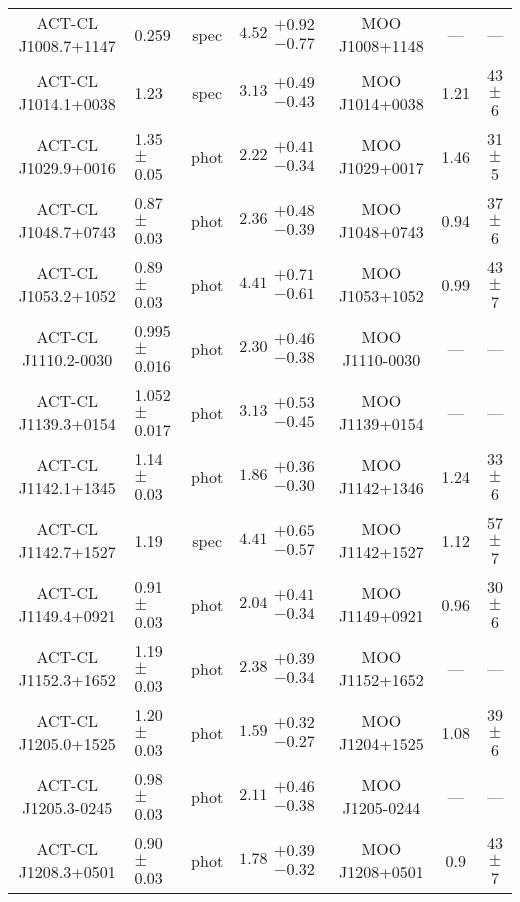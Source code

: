 \begin{longtable}[p!]{clccccc}
ACT-CL J1008.7+1147 & 0.259& spec & $4.52\substack{+0.92\\-0.77}$ & MOO J1008+1148 & --- & ---\\
ACT-CL J1014.1+0038 & 1.23& spec & $3.13\substack{+0.49\\-0.43}$ & MOO J1014+0038 & 1.21 & 43$\pm$ 6 \\
ACT-CL J1029.9+0016 & 1.35$\pm$ 0.05 & phot & $2.22\substack{+0.41\\-0.34}$ & MOO J1029+0017 & 1.46 & 31$\pm$ 5 \\
ACT-CL J1048.7+0743 & 0.87$\pm$ 0.03 & phot & $2.36\substack{+0.48\\-0.39}$ & MOO J1048+0743 & 0.94 & 37$\pm$ 6 \\
ACT-CL J1053.2+1052 & 0.89$\pm$ 0.03 & phot & $4.41\substack{+0.71\\-0.61}$ & MOO J1053+1052 & 0.99 & 43$\pm$ 7 \\
ACT-CL J1110.2-0030 & 0.995$\pm$ 0.016 & phot & $2.30\substack{+0.46\\-0.38}$ & MOO J1110-0030 & --- & ---\\
ACT-CL J1139.3+0154 & 1.052$\pm$ 0.017 & phot & $3.13\substack{+0.53\\-0.45}$ & MOO J1139+0154 & --- & ---\\
ACT-CL J1142.1+1345 & 1.14$\pm$ 0.03 & phot & $1.86\substack{+0.36\\-0.30}$ & MOO J1142+1346 & 1.24 & 33$\pm$ 6 \\
ACT-CL J1142.7+1527 & 1.19& spec & $4.41\substack{+0.65\\-0.57}$ & MOO J1142+1527 & 1.12 & 57$\pm$ 7 \\
ACT-CL J1149.4+0921 & 0.91$\pm$ 0.03 & phot & $2.04\substack{+0.41\\-0.34}$ & MOO J1149+0921 & 0.96 & 30$\pm$ 6 \\
ACT-CL J1152.3+1652 & 1.19$\pm$ 0.03 & phot & $2.38\substack{+0.39\\-0.34}$ & MOO J1152+1652 & --- & ---\\
ACT-CL J1205.0+1525 & 1.20$\pm$ 0.03 & phot & $1.59\substack{+0.32\\-0.27}$ & MOO J1204+1525 & 1.08 & 39$\pm$ 6 \\
ACT-CL J1205.3-0245 & 0.98$\pm$ 0.03 & phot & $2.11\substack{+0.46\\-0.38}$ & MOO J1205-0244 & --- & ---\\
ACT-CL J1208.3+0501 & 0.90$\pm$ 0.03 & phot & $1.78\substack{+0.39\\-0.32}$ & MOO J1208+0501 & 0.9 & 43$\pm$ 7 \\

\end{longtable}
